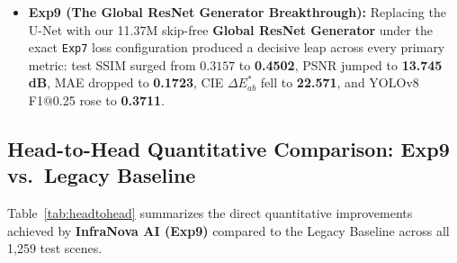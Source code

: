 \documentclass[10pt,a4paper,twoside]{article}
\begin{document}
\begin{itemize}
    \item \textbf{Exp9 (The Global ResNet Generator Breakthrough):} Replacing the U-Net with our 11.37M skip-free \textbf{Global ResNet Generator} under the exact \texttt{Exp7} loss configuration produced a decisive leap across every primary metric: test SSIM surged from $0.3157$ to \textbf{0.4502}, PSNR jumped to \textbf{13.745 dB}, MAE dropped to \textbf{0.1723}, CIE $\Delta E^*_{ab}$ fell to \textbf{22.571}, and YOLOv8 F1@0.25 rose to \textbf{0.3711}.
\end{itemize}

\subsection{Head-to-Head Quantitative Comparison: Exp9 vs.~Legacy Baseline}
Table~\ref{tab:headtohead} summarizes the direct quantitative improvements achieved by \textbf{InfraNova AI (Exp9)} compared to the Legacy Baseline across all 1,259 test scenes.
\end{document}
